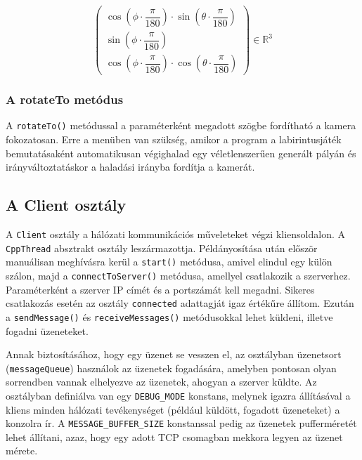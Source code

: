 \begin{equation}
	\begin{pmatrix}
		\cos\left(\phi\cdot\dfrac{\pi}{180}\right) \cdot \sin\left(\theta\cdot\dfrac{\pi}{180}\right) \\[10pt]
		\sin\left(\phi\cdot\dfrac{\pi}{180}\right) \\[10pt]
		\cos\left(\phi\cdot\dfrac{\pi}{180}\right) \cdot \cos\left(\theta\cdot\dfrac{\pi}{180}\right)
	\end{pmatrix}
	\in \mathbb{R}^3
\end{equation}

\subsubsection{A rotateTo metódus}

A \verb|rotateTo()| metódussal a paraméterként megadott szögbe fordítható a kamera fokozatosan. Erre a menüben van szükség, amikor a program a labirintusjáték bemutatásaként automatikusan végighalad egy véletlenszerűen generált pályán és irányváltoztatáskor a haladási irányba fordítja a kamerát.

\subsection{A Client osztály}

A \verb|Client| osztály a hálózati kommunikációs műveleteket végzi kliensoldalon. A \verb|CppThread| \cite{cppthread} absztrakt osztály leszármazottja. Példányosítása után először manuálisan meghívásra kerül a \verb|start()| metódusa, amivel elindul egy külön szálon, majd a \verb|connectToServer()| metódusa, amellyel csatlakozik a szerverhez. Paraméterként a szerver IP címét és a portszámát kell megadni. Sikeres csatlakozás esetén az osztály \verb|connected| adattagját igaz értékűre állítom. Ezután a \verb|sendMessage()| és \verb|receiveMessages()| metódusokkal lehet küldeni, illetve fogadni üzeneteket.

Annak biztosításához, hogy egy üzenet se vesszen el, az osztályban üzenetsort (\verb|messageQueue|) használok az üzenetek fogadására, amelyben pontosan olyan sorrendben vannak elhelyezve az üzenetek, ahogyan a szerver küldte. Az osztályban definiálva van egy \verb|DEBUG_MODE| konstans, melynek igazra állításával a kliens minden hálózati tevékenységet (például küldött, fogadott üzeneteket) a konzolra ír. A \verb|MESSAGE_BUFFER_SIZE| konstanssal pedig az üzenetek pufferméretét lehet állítani, azaz, hogy egy adott TCP csomagban mekkora legyen az üzenet mérete.

